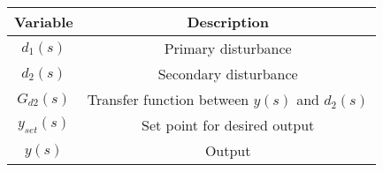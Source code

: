       \begin{tabular}{|c|c|} 
      \hline
\textbf{Variable}& \textbf{Description}\\\hline
         $d_1(s)$& Primary disturbance \\\hline
         $d_2(s)$& Secondary disturbance \\\hline
         $G_{d2}(s)$&Transfer function between $y(s)$ and $d_2(s)$\\\hline
         $y_{set}(s)$& Set point for desired output \\\hline
         $y(s)$ & Output \\\hline
              \end{tabular}
